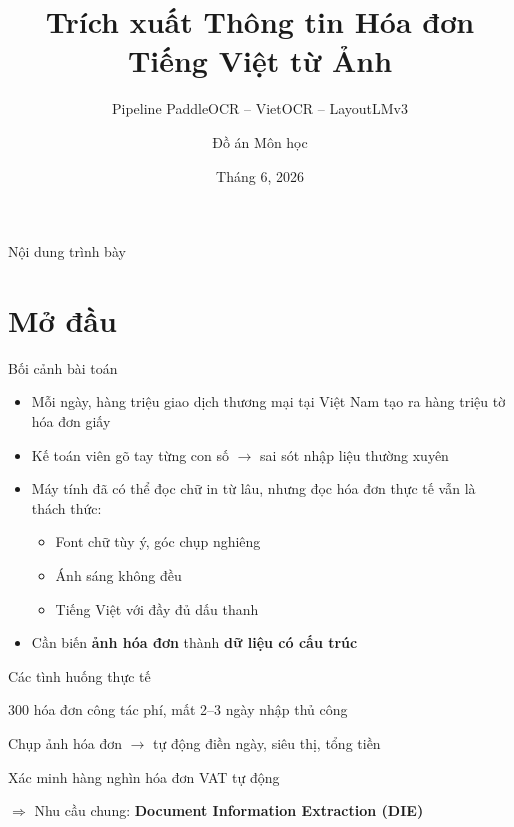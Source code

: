 \documentclass[aspectratio=169, 10pt]{beamer}
\title[Trích xuất Hóa đơn VN]{\textbf{Trích xuất Thông tin Hóa đơn Tiếng Việt từ Ảnh}}
\subtitle{Pipeline PaddleOCR -- VietOCR -- LayoutLMv3}
\author{Đồ án Môn học}
\institute{Học viện Công nghệ Bưu chính Viễn thông \\ Khoa Công nghệ Thông tin 2}
\date{Tháng 6, 2026}
\begin{document}
\begin{frame}[plain]
 \titlepage
\end{frame}

\begin{frame}{Nội dung trình bày}
 \tableofcontents
\end{frame}

\section{Mở đầu}

\begin{frame}{Bối cảnh bài toán}
 \begin{itemize}
 \item[$\bullet$] Mỗi ngày, hàng triệu giao dịch thương mại tại Việt Nam tạo ra hàng triệu tờ hóa đơn giấy
 \item[$\bullet$] Kế toán viên gõ tay từng con số $\rightarrow$ sai sót nhập liệu thường xuyên
 \item[$\bullet$] Máy tính đã có thể đọc chữ in từ lâu, nhưng đọc hóa đơn thực tế vẫn là thách thức:
 \begin{itemize}
 \item Font chữ tùy ý, góc chụp nghiêng
 \item Ánh sáng không đều
 \item Tiếng Việt với đầy đủ dấu thanh
 \end{itemize}
 \item[$\bullet$] Cần biến \textbf{ảnh hóa đơn} thành \textbf{dữ liệu có cấu trúc}
 \end{itemize}
\end{frame}

\begin{frame}{Các tình huống thực tế}
 \begin{infobox}
 300 hóa đơn công tác phí, mất 2--3 ngày nhập thủ công
 \end{infobox}
 \vspace{0.2cm}
 \begin{infobox}
 Chụp ảnh hóa đơn $\rightarrow$ tự động điền ngày, siêu thị, tổng tiền
 \end{infobox}
 \vspace{0.2cm}
 \begin{infobox}
 Xác minh hàng nghìn hóa đơn VAT tự động
 \end{infobox}
 \vspace{0.3cm}
 \centering
 $\Rightarrow$ Nhu cầu chung: \textbf{\textcolor{accent}{Document Information Extraction (DIE)}}
\end{frame}
\end{document}
